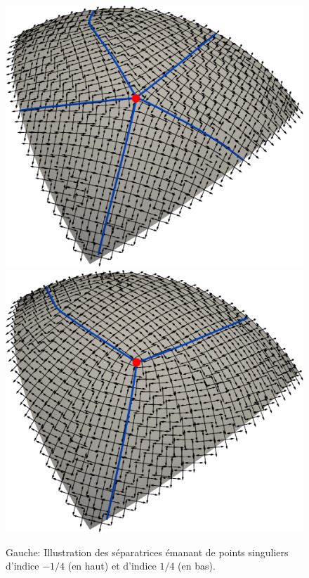 \begin{figure}[!h]
  \centering
  \includegraphics[scale=0.25]{images/surface_sepa_5.pdf}
\\[0.5cm]
  \includegraphics[scale=0.25]{images/surface_sepa_3.pdf}
  \caption{Gauche: Illustration des séparatrices émanant de points singuliers d'indice $-1/4$ (en haut) et d'indice $1/4$ (en bas).}
  \label{fig:separatrice_illustration_surface}
\end{figure}



